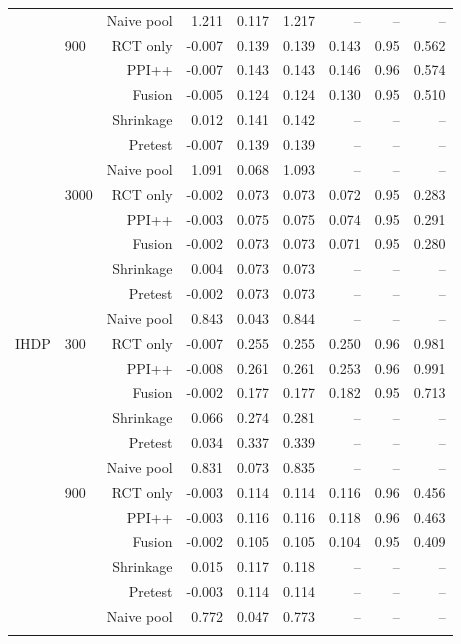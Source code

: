 \begin{tabular}{llrrrrrrr}
 &  & Naive pool & 1.211 & 0.117 & 1.217 & -- & -- & -- \\
\addlinespace
 & 900 & RCT only & -0.007 & 0.139 & 0.139 & 0.143 & 0.95 & 0.562 \\
 &  & PPI++ & -0.007 & 0.143 & 0.143 & 0.146 & 0.96 & 0.574 \\
 &  & Fusion & -0.005 & 0.124 & 0.124 & 0.130 & 0.95 & 0.510 \\
 &  & Shrinkage & 0.012 & 0.141 & 0.142 & -- & -- & -- \\
 &  & Pretest & -0.007 & 0.139 & 0.139 & -- & -- & -- \\
 &  & Naive pool & 1.091 & 0.068 & 1.093 & -- & -- & -- \\
\addlinespace
 & 3000 & RCT only & -0.002 & 0.073 & 0.073 & 0.072 & 0.95 & 0.283 \\
 &  & PPI++ & -0.003 & 0.075 & 0.075 & 0.074 & 0.95 & 0.291 \\
 &  & Fusion & -0.002 & 0.073 & 0.073 & 0.071 & 0.95 & 0.280 \\
 &  & Shrinkage & 0.004 & 0.073 & 0.073 & -- & -- & -- \\
 &  & Pretest & -0.002 & 0.073 & 0.073 & -- & -- & -- \\
 &  & Naive pool & 0.843 & 0.043 & 0.844 & -- & -- & -- \\
\midrule
IHDP & 300 & RCT only & -0.007 & 0.255 & 0.255 & 0.250 & 0.96 & 0.981 \\
 &  & PPI++ & -0.008 & 0.261 & 0.261 & 0.253 & 0.96 & 0.991 \\
 &  & Fusion & -0.002 & 0.177 & 0.177 & 0.182 & 0.95 & 0.713 \\
 &  & Shrinkage & 0.066 & 0.274 & 0.281 & -- & -- & -- \\
 &  & Pretest & 0.034 & 0.337 & 0.339 & -- & -- & -- \\
 &  & Naive pool & 0.831 & 0.073 & 0.835 & -- & -- & -- \\
\addlinespace
 & 900 & RCT only & -0.003 & 0.114 & 0.114 & 0.116 & 0.96 & 0.456 \\
 &  & PPI++ & -0.003 & 0.116 & 0.116 & 0.118 & 0.96 & 0.463 \\
 &  & Fusion & -0.002 & 0.105 & 0.105 & 0.104 & 0.95 & 0.409 \\
 &  & Shrinkage & 0.015 & 0.117 & 0.118 & -- & -- & -- \\
 &  & Pretest & -0.003 & 0.114 & 0.114 & -- & -- & -- \\
 &  & Naive pool & 0.772 & 0.047 & 0.773 & -- & -- & -- \\
\addlinespace

\end{tabular}
